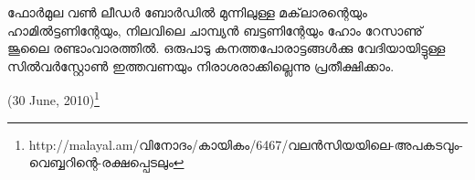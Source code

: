ഫോര്‍മുല വണ്‍ ലീഡര്‍ ബോര്‍ഡില്‍ മുന്നിലുള്ള മക്‌ലാരന്റെയും ഹാമില്‍ട്ടണിന്റേയും, നിലവിലെ ചാമ്പ്യന്‍ ബട്ടണിന്റേയും
ഹോം റേസാണു് ജൂലൈ രണ്ടാംവാരത്തില്‍. ഒരുപാടു കനത്തപോരാട്ടങ്ങള്‍ക്കു വേദിയായിട്ടുള്ള സില്‍വര്‍സ്റ്റോണ്‍ 
ഇത്തവണയും നിരാശരാക്കില്ലെന്നു പ്രതീക്ഷിക്കാം.

\begin{flushright}(30 June, 2010)\footnote{http://malayal.am/വിനോദം/കായികം/6467/വലന്‍സിയയിലെ-അപകടവും-വെബ്ബറിന്റെ-രക്ഷപ്പെടലും}\end{flushright}

\newpage
